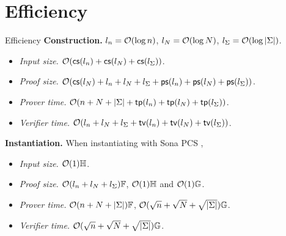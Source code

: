 \section{Efficiency}
\begin{frame}{Efficiency}
	\textbf{Construction.} $l_n = \mathcal{O}(\log n)$, $l_N = \mathcal{O}(\log N)$, $l_\Sigma = \mathcal{O}(\log \left|\Sigma\right|)$.
	\begin{itemize}
		\item \textit{Input size.}  $\mathcal{O}(\mathsf{cs}(l_n)+ \mathsf{cs}(l_N)+\mathsf{cs}(l_\Sigma) )$.
		\item \textit{Proof size.} $
		\mathcal{O}(\mathsf{cs}(l_N) +l_n +l_N+l_\Sigma+ \mathsf{ps}(l_n)+  \mathsf{ps}(l_N) + \mathsf{ps}(l_\Sigma) )
		$.
		\item \textit{Prover time.} 
		$
		\mathcal{O}(n+N + \left|\Sigma\right| + \mathsf{tp}(l_n)+  \mathsf{tp}(l_N)+\mathsf{tp}(l_\Sigma) )
		$.
		\item \textit{Verifier time.} 
		$
		\mathcal{O}(l_n + l_N + l_\Sigma + \mathsf{tv}(l_n) + \mathsf{tv}(l_N)+\mathsf{tv}(l_\Sigma) )
		$.
	\end{itemize}
	
	\smallskip\noindent\textbf{Instantiation.} When instantiating with Sona PCS \cite{EC:SetThaWah23b}, 
	\begin{itemize}
		\item \textit{Input size.} $\mathcal{O}(1) \mathbb{H}$.
		\item \textit{Proof size.} $\mathcal{O}(l_n + l_N + l_\Sigma)\mathbb{F}$, $\mathcal{O}(1) \mathbb{H}$ and $\mathcal{O}(1) \mathbb{G}$.
		\item \textit{Prover time.} $\mathcal{O}(n+N+ \left|\Sigma\right|) \mathbb{F}$, $\mathcal{O}(\sqrt{n}+ \sqrt{N} +\sqrt{\left|\Sigma\right|} ) \mathbb{G}$.
		\item \textit{Verifier time.} $\mathcal{O}(\sqrt{n}+ \sqrt{N} +\sqrt{\left|\Sigma\right|}) \mathbb{G}$.
	\end{itemize}
\end{frame}